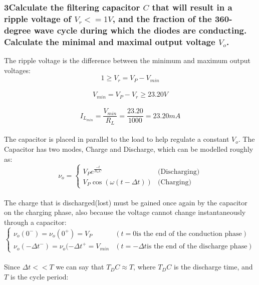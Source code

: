 \documentclass[]{article}
\begin{document}
	\subsubsection*{3\indent Calculate the filtering capacitor $C$ that will result in a ripple voltage of $V_r <= 1V$, and the fraction of the 360-degree wave cycle during which the diodes are conducting. Calculate the minimal and maximal output voltage $V_o$.}
	{
		The ripple voltage is the difference between the minimum and maximum output voltages:
		\begin{equation} 
			1 \ge V_r = V_P - V_{min}
		\end{equation}
		\\
		\begin{equation} 
		V_{min} = V_P - V_r \ge 23.20V
		\end{equation}
		\\
		\begin{equation} 
			I_{L_{min}} = \frac{V_{min}}{R_L} = \frac{23.20}{1000} = 23.20mA
		\end{equation}
		\\
		The capacitor is placed in parallel to the load to help regulate a constant $V_o$. The Capacitor has two modes, Charge and Discharge, which can be modelled roughly as:
		\begin{equation}
			\nu_o = 
			\begin{cases}
				V_Pe^{\frac{-t}{R_LC}} & \text{(Discharging)} 
				\\
				V_P\cos{(\omega(t - \Delta t))} & \text{(Charging)}
			\end{cases}
		\end{equation}
		\\
		The charge that is discharged(lost) must be gained once again by the capacitor on the charging phase, also because the voltage cannot change instantaneously through a capacitor:
		\begin{equation}
			\begin{cases}
				\nu_o(0^{-}) = \nu_o(0^{+}) = V_P & (t = 0 \text{is the end of the conduction phase})
				\\
				\nu_o({-\Delta t}^{-}) = \nu_o({-\Delta t}^{+} = V_{min} & (t = -\Delta t \text{is the end of the discharge phase})
			\end{cases}
		\end{equation}
		\\
		Since $\Delta t << T$ we can say that $T_DC \approx T$, where $T_DC$ is the discharge time, and $T$ is the cycle period:
		\begin{equation}

\end{equation}}
\end{document}
